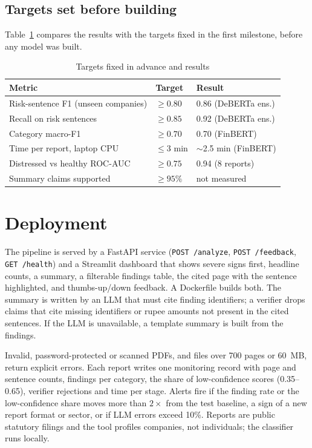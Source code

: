 \documentclass[conference]{IEEEtran}
\begin{document}
\subsection{Targets set before building}
Table~\ref{tab:targets} compares the results with the targets fixed in the first milestone, before any model was built.

\begin{table}[t]
\caption{Targets fixed in advance and results}
\label{tab:targets}
\centering
\setlength{\tabcolsep}{3pt}
\begin{tabular}{@{}lll@{}}
\toprule
Metric & Target & Result \\
\midrule
Risk-sentence F1 (unseen companies) & $\ge 0.80$ & 0.86 (DeBERTa ens.) \\
Recall on risk sentences & $\ge 0.85$ & 0.92 (DeBERTa ens.) \\
Category macro-F1 & $\ge 0.70$ & 0.70 (FinBERT) \\
Time per report, laptop CPU & $\le 3$ min & $\sim$2.5 min (FinBERT) \\
Distressed vs healthy ROC-AUC & $\ge 0.75$ & 0.94 (8 reports) \\
Summary claims supported & $\ge 95\%$ & not measured \\
\bottomrule
\end{tabular}
\end{table}

\section{Deployment}
The pipeline is served by a FastAPI service (\texttt{POST /analyze}, \texttt{POST /feedback}, \texttt{GET /health}) and a Streamlit dashboard that shows severe signs first, headline counts, a summary, a filterable findings table, the cited page with the sentence highlighted, and thumbs-up/down feedback. A Dockerfile builds both. The summary is written by an LLM that must cite finding identifiers; a verifier drops claims that cite missing identifiers or rupee amounts not present in the cited sentences. If the LLM is unavailable, a template summary is built from the findings.

Invalid, password-protected or scanned PDFs, and files over 700 pages or 60~MB, return explicit errors. Each report writes one monitoring record with page and sentence counts, findings per category, the share of low-confidence scores (0.35--0.65), verifier rejections and time per stage. Alerts fire if the finding rate or the low-confidence share moves more than $2\times$ from the test baseline, a sign of a new report format or sector, or if LLM errors exceed 10\%. Reports are public statutory filings and the tool profiles companies, not individuals; the classifier runs locally.
\end{document}

